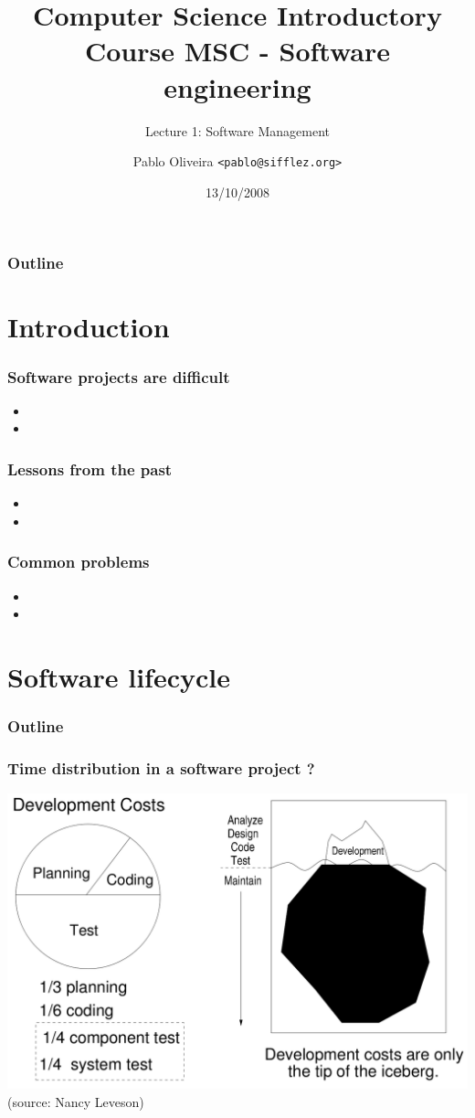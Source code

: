 \documentclass[10pt]{beamer}
\title{Computer Science Introductory Course MSC - Software engineering}
\subtitle{Lecture 1: Software Management}
\author[Pablo Oliveira]{Pablo Oliveira \texttt{<pablo@sifflez.org>}}
\institute{ENST}
\date{13/10/2008}
\begin{document}
\begin{frame}
  \titlepage
\end{frame}

\begin{frame}
  \frametitle{Outline}
  \tableofcontents
\end{frame}

\section{Introduction}
\begin{frame}[fragile]
  \frametitle{Software projects are difficult}
  \begin{itemize}
  \item
  \item
  \end{itemize}
\end{frame}

\begin{frame}[fragile]
  \frametitle{Lessons from the past}
  \begin{itemize}
  \item
  \item
  \end{itemize}
\end{frame}

\begin{frame}[fragile]
  \frametitle{Common problems}
  \begin{itemize}
  \item
  \item
  \end{itemize}
\end{frame}

\section{Software lifecycle}

\begin{frame}
  \frametitle{Outline}
  \tableofcontents[currentsection]
\end{frame}

\begin{frame}[fragile]
  \frametitle{Time distribution in a software project ?}
  \includegraphics[width=\textwidth]{soft_cost}
  \tiny(source: Nancy Leveson)
\end{frame}
\end{document}
